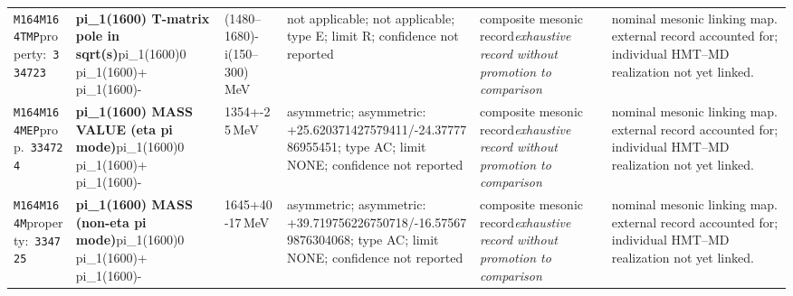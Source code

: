 \begin{landscape}
\begin{longtable}{L{1.85cm}L{4.45cm}L{2.35cm}L{4.05cm}L{3.35cm}L{7.15cm}}
\texttt{M164}\newline \texttt{M164TMP}\newline property:\ \texttt{334723} & \textbf{pi\_\allowbreak{}1(1600) T-matrix pole in sqrt(s)}\newline pi\_\allowbreak{}1(1600)0 \textbar{}\allowbreak{} pi\_\allowbreak{}1(1600)+ \textbar{}\allowbreak{} pi\_\allowbreak{}1(1600)- & (1480--1680)-i(150--300)\,MeV & not applicable; not applicable; type E; limit R; confidence not reported & composite mesonic record\newline \emph{exhaustive record without promotion to comparison} & nominal mesonic linking map. external record accounted for; individual HMT--MD realization not yet linked. \\
\texttt{M164}\newline \texttt{M164MEP}\newline prop.\ \texttt{334724} & \textbf{pi\_\allowbreak{}1(1600) MASS VALUE (eta pi mode)}\newline pi\_\allowbreak{}1(1600)0 \textbar{}\allowbreak{} pi\_\allowbreak{}1(1600)+ \textbar{}\allowbreak{} pi\_\allowbreak{}1(1600)- & 1354+-25\,MeV & asymmetric; asymmetric: +25.620371427579411/-24.3777786955451; type AC; limit NONE; confidence not reported & composite mesonic record\newline \emph{exhaustive record without promotion to comparison} & nominal mesonic linking map. external record accounted for; individual HMT--MD realization not yet linked. \\
\texttt{M164}\newline \texttt{M164M}\newline property:\ \texttt{334725} & \textbf{pi\_\allowbreak{}1(1600) MASS (non-eta pi mode)}\newline pi\_\allowbreak{}1(1600)0 \textbar{}\allowbreak{} pi\_\allowbreak{}1(1600)+ \textbar{}\allowbreak{} pi\_\allowbreak{}1(1600)- & 1645+40-17\,MeV & asymmetric; asymmetric: +39.719756226750718/-16.575679876304068; type AC; limit NONE; confidence not reported & composite mesonic record\newline \emph{exhaustive record without promotion to comparison} & nominal mesonic linking map. external record accounted for; individual HMT--MD realization not yet linked. \\

\end{longtable}
\end{landscape}
